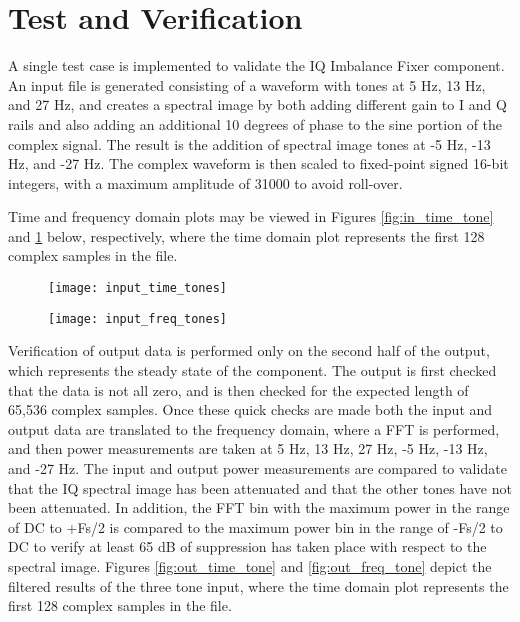 \section*{Test and Verification}
\begin{flushleft}
A single test case is implemented to validate the IQ Imbalance Fixer component. An input file is generated consisting of a waveform with tones at 5 Hz, 13 Hz, and 27 Hz, and creates a spectral image by both adding different gain to I and Q rails and also adding an additional 10 degrees of phase to the sine portion of the complex signal. The result is the addition of spectral image tones at -5 Hz, -13 Hz, and -27 Hz. The complex waveform is then scaled to fixed-point signed 16-bit integers, with a maximum amplitude of 31000 to avoid roll-over.\medskip

Time and frequency domain plots may be viewed in Figures \ref{fig:in_time_tone} and \ref{fig:in_freq_tone} below, respectively, where the time domain plot represents the first 128 complex samples in the file.
\end{flushleft}

\begin{figure}[ht]
	\centering
	\begin{minipage}{.5\textwidth}
		\centering\texttt{[image: input\_time\_tones]}
		\label{fig:in_time_tone}
	\end{minipage}%
	\begin{minipage}{.5\textwidth}
		\centering\texttt{[image: input\_freq\_tones]}
		\label{fig:in_freq_tone}
	\end{minipage}
\end{figure}

\begin{flushleft}
Verification of output data is performed only on the second half of the output, which represents the steady state of the component. The output is first checked that the data is not all zero, and is then checked for the expected length of 65,536 complex samples. Once these quick checks are made both the input and output data are translated to the frequency domain, where a FFT is performed, and then power measurements are taken at 5 Hz, 13 Hz, 27 Hz, -5 Hz, -13 Hz, and -27 Hz. The input and output power measurements are compared to validate that the IQ spectral image has been attenuated and that the other tones have not been attenuated. In addition, the FFT bin with the maximum power in the range of DC to +Fs/2 is compared to the maximum power bin in the range of -Fs/2 to DC to verify at least 65 dB of suppression has taken place with respect to the spectral image. Figures \ref{fig:out_time_tone} and \ref{fig:out_freq_tone} depict the filtered results of the three tone input, where the time domain plot represents the first 128 complex samples in the file.
\end{flushleft}

